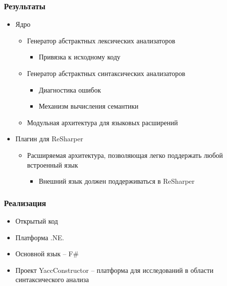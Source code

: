 \documentclass{beamer}
\begin{document}
\begin{frame}[fragile]
	\transwipe[direction=90]
	\frametitle{Результаты}
	\begin{itemize}
	    \item Ядро
	    \begin{itemize}
	        \item Генератор абстрактных лексических анализаторов
    	    \begin{itemize}
                \item Привязка к исходному коду
	        \end{itemize}
	        \item Генератор абстрактных синтаксических анализаторов
    	    \begin{itemize}
                \item Диагностика ошибок
                \item Механизм вычисления семантики
	        \end{itemize}
            \item Модульная архитектура для языковых расширений
        \end{itemize}
	    \item Плагин для ReSharper
	    \begin{itemize}
	        \item Расширяемая архитектура, позволяющая легко поддержать любой встроенный язык
	        \begin{itemize}
	            \item Внешний язык должен поддерживаться в ReSharper
            \end{itemize}
        \end{itemize}
	\end{itemize}
\end{frame}

\begin{frame}[fragile]
	\transwipe[direction=90]
	\frametitle{Реализация}
	\begin{itemize}
	    \item Открытый код
	    \item Платформа .NE.
	    \item Основной язык -- F\#
	    \item Проект YaccConstructor -- платформа для исследований в области синтаксического анализа
	\end{itemize}
\end{frame}
\end{document}

